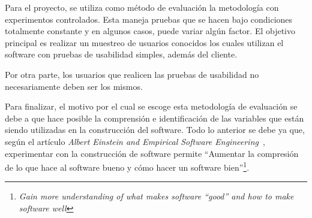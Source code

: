 Para el proyecto, se utiliza como método de evaluación la metodología con experimentos controlados. Esta maneja pruebas que se hacen bajo condiciones totalmente constante y en algunos casos, puede variar algún factor. El objetivo principal es realizar un muestreo de usuarios conocidos los cuales utilizan el software con pruebas de usabilidad simples, además del cliente.

Por otra parte, los usuarios que realicen las pruebas de usabilidad no necesariamente deben ser los mismos.

Para finalizar, el motivo por el cual se escoge esta metodología de evaluación se debe a que hace posible la comprensión e identificación de las variables que están siendo utilizadas en la construcción del software.  Todo lo anterior se debe ya que, según el artículo \emph{Albert Einstein and Empirical Software Engineering}~\cite{8}, experimentar con la construcción de software permite ``Aumentar la compresión de lo que hace al software bueno y cómo hacer un software bien''\footnote{\emph{Gain more understanding of what makes software ``good'' and how to make software well}}.